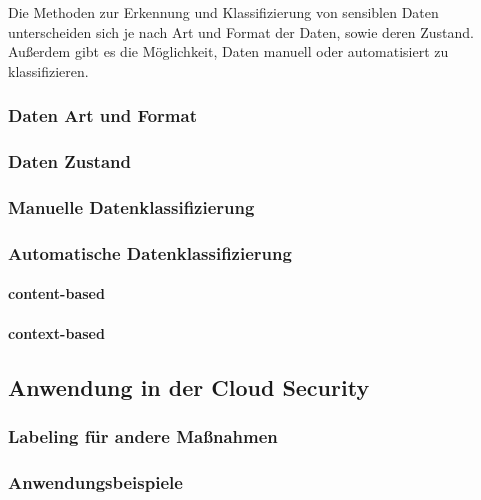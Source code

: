 Die Methoden zur Erkennung und Klassifizierung von sensiblen Daten unterscheiden sich je nach Art und Format der Daten, sowie deren Zustand. Außerdem gibt es die Möglichkeit, Daten manuell oder automatisiert zu klassifizieren.

\subsubsection{Daten Art und Format}


\subsubsection{Daten Zustand}

\subsubsection{Manuelle Datenklassifizierung}


\subsubsection{Automatische Datenklassifizierung}



\paragraph{content-based}

\paragraph{context-based}



\subsection{Anwendung in der Cloud Security}

\subsubsection{Labeling für andere Maßnahmen}

\subsubsection{Anwendungsbeispiele}
